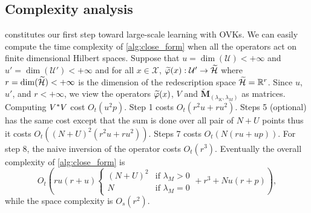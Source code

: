 \subsection{Complexity analysis}
 constitutes our first step toward large-scale learning
with \aclp{OVK}. We can easily compute the time complexity of
\cref{alg:close_form} when all the operators act on finite dimensional Hilbert
spaces. Suppose that $u=\dim(\mathcal{U})<+\infty$ and
$u'=\dim(\mathcal{U}')<+\infty$ and for all $x\in\mathcal{X}$,
$\tildePhi{\omega}(x):\mathcal{U}'\to\tildeH{\omega}$ where
$r=\dim(\widetilde{\mathcal{H}})<+\infty$ is the dimension of the redescription space
$\widetilde{\mathcal{H}}=\mathbb{R}^{r}$. Since $u$, $u'$, and $r<+\infty$, we view the
operators $\tildePhi{\omega}(x)$, $V$ and
$\widetilde{\mathbf{M}}_{\left(\lambda_K,\lambda_M\right)}$ as matrices.
Computing $V^* V$ cost $O_t(u^2p)$. Step 1 costs $O_t(r^2u + ru^2)$.
Steps 5 (optional) has the same cost except that the sum is done over all pair
of $N+U$ points thus it costs $O_t((N+U)^2(r^2u + r u^2))$. Steps 7 costs
$O_t(N(ru + up))$. For step 8, the naive inversion of the operator costs
$O_t(r^3)$. Eventually the overall complexity of \cref{alg:close_form} is
\begin{dmath*}
    O_t\left(ru(r + u) \begin{cases} (N+U)^2 & \text{if $\lambda_M > 0$} \\ N &
    \text{if $\lambda_M = 0$} \end{cases}+ r^3 + Nu(r+p) \right),
\end{dmath*}
while the space complexity is $O_s(r^2)$.
